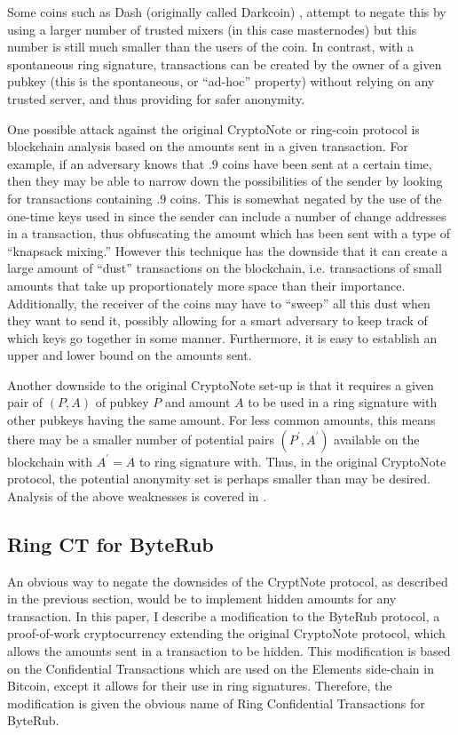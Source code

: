 \documentclass[12pt,english]{mrl}
\theoremstyle{definition}
\numberwithin{equation}{section}
\numberwithin{figure}{section}
\numberwithin{equation}{section}
\numberwithin{equation}{section}
\numberwithin{figure}{section}
\begin{document}
Some coins such
as Dash (originally called Darkcoin) \cite{DASH}, attempt to negate this by using a larger number
of trusted mixers (in this case masternodes) but this number is still
much smaller than the users of the coin. In contrast, with a spontaneous
ring signature, transactions can be created by the owner of a given
pubkey (this is the spontaneous, or ``ad-hoc'' property) without relying
on any trusted server, and thus providing for safer anonymity. 

One possible attack against the original CryptoNote or  ring-coin protocol \cite{CN,B2}
is blockchain analysis based on the amounts sent in a given transaction.
For example, if an adversary knows that $.9$ coins have been sent
at a certain time, then they may be able to narrow down the possibilities
of the sender by looking for transactions containing $.9$ coins.
This is somewhat negated by the use of the one-time keys used in \cite{CN}
since the sender can include a number of change addresses in a transaction,
thus obfuscating the amount which has been sent with a type of ``knapsack mixing.'' However this technique
has the downside that it can create a large amount of ``dust'' transactions
on the blockchain, i.e. transactions of small amounts that take up
proportionately more space than their importance. Additionally, the
receiver of the coins may have to ``sweep'' all this dust when they
want to send it, possibly allowing for a smart adversary to keep track
of which keys go together in some manner. Furthermore, it is easy to establish an upper and lower bound on the amounts sent. 

Another downside to the original CryptoNote set-up is that it requires a given
pair of $\left(P,A\right)$ of pubkey $P$ and amount $A$ to be used in a ring
signature with other pubkeys having the same amount. For less common
amounts, this means there may be a smaller number of potential pairs
$\left(P^{\prime},A^{\prime}\right)$ available on the blockchain
with $A^{\prime}=A$ to ring signature with. Thus, in the original CryptoNote protocol, the potential anonymity set is perhaps smaller than may be desired. 
  Analysis of the above weaknesses is covered in \cite{mrl4}.


\subsection{Ring CT for ByteRub}

An obvious way to negate the downsides of the CryptNote protocol, as described in the previous section, would be to implement hidden amounts for any transaction.
In this
paper, I describe a modification to the ByteRub protocol, a proof-of-work
cryptocurrency extending the original CryptoNote protocol, which allows the amounts sent in
a transaction to be hidden. This modification is based on the Confidential
Transactions \cite{GM} which are used on the Elements side-chain
in Bitcoin, except it allows for their use in ring signatures. Therefore,
the modification is given the obvious name of Ring Confidential Transactions for ByteRub. 
\end{document}
